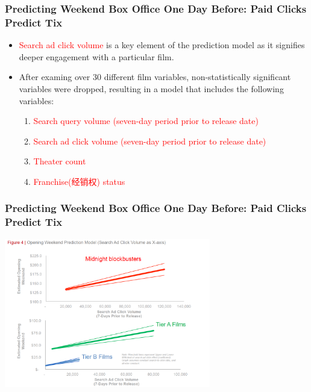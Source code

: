 \documentclass[slidestop,compress,red,mathserif]{beamer}
\begin{document}
\begin{frame}
\frametitle{Predicting Weekend Box Office One Day Before: Paid Clicks Predict Tix}
\begin{itemize}
	\pause \item  \textcolor{red}{Search ad click volume} is a key element of the prediction model as it signifies deeper engagement with a particular film.
	\pause \item After examing over 30 different film variables, non-statistically significant variables were dropped, resulting in a model that includes the following variables:
	\begin{enumerate}
		\pause \item \textcolor{red}{Search query volume (seven-day period prior to release date)}
		\pause \item \textcolor{red}{Search ad click volume (seven-day period prior to release date)}
		\pause \item \textcolor{red}{Theater count}
		\pause \item \textcolor{red}{Franchise(经销权) status}
	\end{enumerate}
\end{itemize}
\end{frame}
\begin{frame}
\frametitle{Predicting Weekend Box Office One Day Before: Paid Clicks Predict Tix}
\begin{center}
\includegraphics[width=9cm]{fig4.png}
\end{center}
\end{frame}
\end{document}
